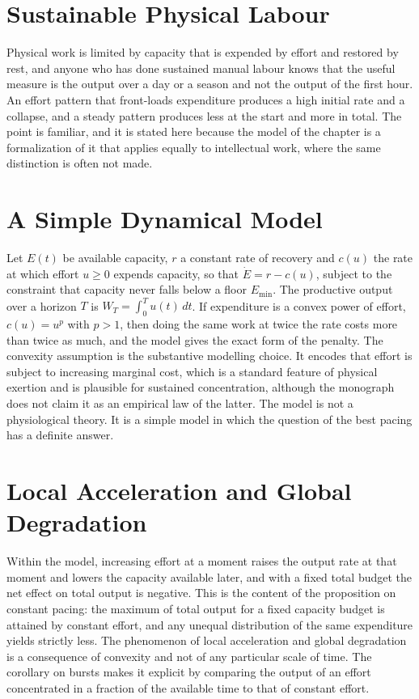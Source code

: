 \documentclass[11pt,letterpaper]{report}
\theoremstyle{plain}
\theoremstyle{definition}
\theoremstyle{remark}
\begin{document}
\section{Sustainable Physical Labour}

Physical work is limited by capacity that is expended by effort and restored by rest, and anyone who has done sustained manual labour knows that the useful measure is the output over a day or a season and not the output of the first hour. An effort pattern that front-loads expenditure produces a high initial rate and a collapse, and a steady pattern produces less at the start and more in total. The point is familiar, and it is stated here because the model of the chapter is a formalization of it that applies equally to intellectual work, where the same distinction is often not made.

\section{A Simple Dynamical Model}

Let $E(t)$ be available capacity, $r$ a constant rate of recovery and $c(u)$ the rate at which effort $u\ge0$ expends capacity, so that $\dot E=r-c(u)$, subject to the constraint that capacity never falls below a floor $E_{\min}$. The productive output over a horizon $T$ is $W_T=\int_0^Tu(t)\,dt$. If expenditure is a convex power of effort, $c(u)=u^p$ with $p>1$, then doing the same work at twice the rate costs more than twice as much, and the model gives the exact form of the penalty. The convexity assumption is the substantive modelling choice. It encodes that effort is subject to increasing marginal cost, which is a standard feature of physical exertion and is plausible for sustained concentration, although the monograph does not claim it as an empirical law of the latter. The model is not a physiological theory. It is a simple model in which the question of the best pacing has a definite answer.

\section{Local Acceleration and Global Degradation}

Within the model, increasing effort at a moment raises the output rate at that moment and lowers the capacity available later, and with a fixed total budget the net effect on total output is negative. This is the content of the proposition on constant pacing: the maximum of total output for a fixed capacity budget is attained by constant effort, and any unequal distribution of the same expenditure yields strictly less. The phenomenon of local acceleration and global degradation is a consequence of convexity and not of any particular scale of time. The corollary on bursts makes it explicit by comparing the output of an effort concentrated in a fraction of the available time to that of constant effort.
\end{document}
